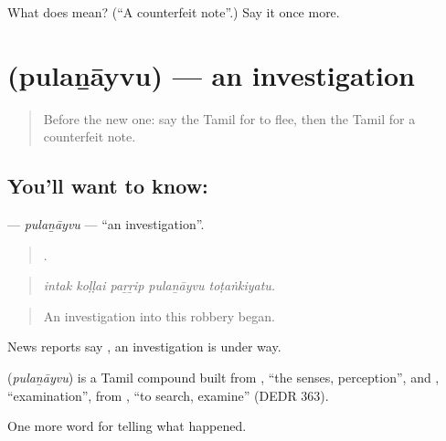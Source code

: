 \begin{tcolorbox}[breakable,colback=teal!4,colframe=teal!35!black,title={Before you move on}]
What does  mean? (\textquotedblleft{}A counterfeit note\textquotedblright{}.) Say it once more.
\end{tcolorbox}
\section[\texorpdfstring{\ta{புலனாய்வு} (pulaṉāyvu)}{புலனாய்வு (pulaṉāyvu)}]{ (pulaṉāyvu) — an investigation}

\label{lesson:TA-C297-pulanayvu}



\begin{quote}
Before the new one: say the Tamil for to flee, then the Tamil for a counterfeit note.
\end{quote}

\subsection*{You'll want to know: }
\textbf{} — \emph{pulaṉāyvu} — \textquotedblleft{}an investigation\textquotedblright{}.

\begin{quote}
    .
\end{quote}

\begin{quote}
\emph{intak koḷḷai paṟṟip pulaṉāyvu toṭaṅkiyatu.}
\end{quote}

\begin{quote}
An investigation into this robbery began.
\end{quote}

News reports say  , an investigation is under way.

\begin{cousinweb}
\textbf{} (\emph{pulaṉāyvu}) is a Tamil compound built from , \textquotedblleft{}the senses, perception\textquotedblright{}, and , \textquotedblleft{}examination\textquotedblright{}, from , \textquotedblleft{}to search, examine\textquotedblright{} (DEDR 363).
\end{cousinweb}

\begin{grammarlens}[title={What you've built}]
One more word for telling what happened.
\end{grammarlens}

